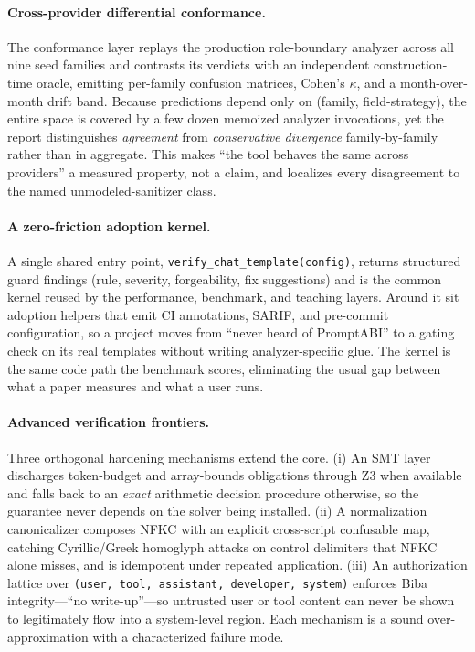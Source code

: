 \documentclass[10pt]{article}
\begin{document}
\paragraph{Cross-provider differential conformance.}
The conformance layer replays the production role-boundary analyzer across all
nine seed families and contrasts its verdicts with an independent
construction-time oracle, emitting per-family confusion matrices, Cohen's
$\kappa$, and a month-over-month drift band. Because predictions depend only on
(family, field-strategy), the entire space is covered by a few dozen memoized
analyzer invocations, yet the report distinguishes \emph{agreement} from
\emph{conservative divergence} family-by-family rather than in aggregate. This
makes ``the tool behaves the same across providers'' a measured property, not a
claim, and localizes every disagreement to the named unmodeled-sanitizer class.

\paragraph{A zero-friction adoption kernel.}
A single shared entry point, \texttt{verify\_chat\_template(config)}, returns
structured guard findings (rule, severity, forgeability, fix suggestions) and is
the common kernel reused by the performance, benchmark, and teaching layers.
Around it sit adoption helpers that emit CI annotations, SARIF, and pre-commit
configuration, so a project moves from ``never heard of PromptABI'' to a
gating check on its real templates without writing analyzer-specific glue. The
kernel is the same code path the benchmark scores, eliminating the usual gap
between what a paper measures and what a user runs.

\paragraph{Advanced verification frontiers.}
Three orthogonal hardening mechanisms extend the core. (i) An SMT layer discharges
token-budget and array-bounds obligations through Z3 when available and falls back
to an \emph{exact} arithmetic decision procedure otherwise, so the guarantee never
depends on the solver being installed. (ii) A normalization canonicalizer composes
NFKC with an explicit cross-script confusable map, catching Cyrillic/Greek
homoglyph attacks on control delimiters that NFKC alone misses, and is idempotent
under repeated application. (iii) An authorization lattice over
\texttt{(user, tool, assistant, developer, system)} enforces Biba integrity---``no
write-up''---so untrusted user or tool content can never be shown to legitimately
flow into a system-level region. Each mechanism is a sound over-approximation with
a characterized failure mode.
\end{document}
